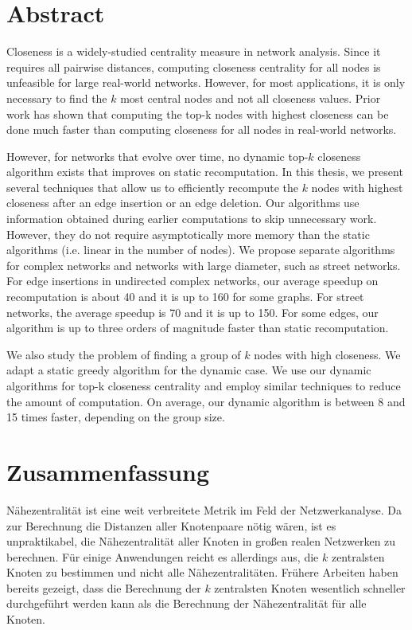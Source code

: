


\chapter{Abstract}

Closeness is a widely-studied centrality measure in network analysis. Since it requires all pairwise distances, computing closeness centrality for all nodes is unfeasible for large real-world networks. However, for most applications, it is only necessary to find the $k$ most central nodes and not all closeness values. Prior work has shown that computing the top-k nodes with highest closeness can be done much faster than computing closeness for all nodes in real-world networks.

However, for networks that evolve over time, no dynamic top-$k$ closeness algorithm exists that improves on static recomputation. In this thesis, we present several techniques that allow us to efficiently recompute the $k$ nodes with highest closeness after an edge insertion or an edge deletion. Our algorithms use information obtained during earlier computations to skip unnecessary work. However, they do not require asymptotically more memory than the static algorithms (i.e. linear in the number of nodes). We propose separate algorithms for complex networks and networks with large diameter, such as street networks. For edge insertions in undirected complex networks, our average speedup on recomputation is about 40 and it is up to 160 for some graphs. For street networks, the average speedup is 70 and it is up to 150. For some edges, our algorithm is up to three orders of magnitude faster than static recomputation.

We also study the problem of finding a group of $k$ nodes with high closeness. We adapt a static greedy algorithm for the dynamic case. We use our dynamic algorithms for top-k closeness centrality and employ similar techniques to reduce the amount of computation. On average, our dynamic algorithm is between 8 and 15 times faster, depending on the group size.
\vspace{1cm}


\chapter{Zusammenfassung}\label{chap:abstract_german}

Nähezentralität ist eine weit verbreitete Metrik im Feld der Netzwerkanalyse. Da zur Berechnung die Distanzen aller Knotenpaare nötig wären, ist es unpraktikabel, die Nähezentralität aller Knoten in großen realen Netzwerken zu berechnen. Für einige Anwendungen reicht es allerdings aus, die $k$ zentralsten Knoten zu bestimmen und nicht alle Nähezentralitäten. Frühere Arbeiten haben bereits gezeigt, dass die Berechnung der $k$ zentralsten Knoten wesentlich schneller durchgeführt werden kann als die Berechnung der Nähezentralität für alle Knoten. 

